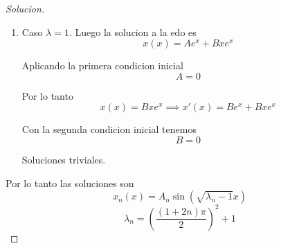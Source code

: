 \documentclass{article}
\theoremstyle{definition}
\newenvironment{solution}{\begin{proof}[Solucion]}{\end{proof}}
\begin{document}
\begin{solution}
\begin{enumerate}
      \item Caso $\lambda = 1$. Luego la solucion a la edo es
            \begin{equation*}
              x(x) = Ae^{x} + Bxe^{x}
            \end{equation*}

            Aplicando la primera condicion inicial
            \begin{equation*}
              A = 0
            \end{equation*}

            Por lo tanto
            \begin{equation*}
              x(x) = Bxe^{x} \implies x'(x) = Be^{x} + Bxe^{x}
            \end{equation*}

            Con la segunda condicion inicial tenemos
            \begin{equation*}
              B = 0
            \end{equation*}

            Soluciones triviales.
    \end{enumerate}

    Por lo tanto las soluciones son
    \begin{equation*}
      x_{n}(x) = A_{n}\sin(\sqrt{\lambda_{n} - 1}x)
    \end{equation*}
    \begin{equation*}
      \lambda_{n} = (\frac{(1 + 2n)\pi}{2})^{2} + 1
    \end{equation*}

\end{solution}
\end{document}
